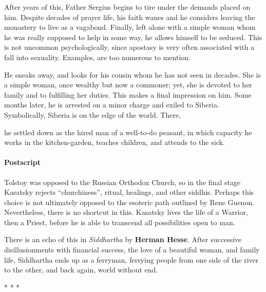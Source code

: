 After years of this, Father Sergius begins to tire under the demands placed on him. Despite decades of prayer life, his faith wanes and he considers leaving the monastery to live as a vagabond. Finally, left alone with a simple woman whom he was really supposed to help in some way, he allows himself to be seduced. This is not uncommon psychologically, since apostasy is very often associated with a fall into sexuality. Examples, are too numerous to mention.

He sneaks away, and looks for his cousin whom he has not seen in decades. She is a simple woman, once wealthy but now a commoner; yet, she is devoted to her family and to fulfilling her duties. This makes a final impression on him. Some months later, he is arrested on a minor charge and exiled to Siberia. Symbolically, Siberia is on the edge of the world. There,

\begin{quotex}
he settled down as the hired man of a well-to-do peasant, in which capacity he works in the kitchen-garden, teaches children, and attends to the sick.
\end{quotex}


\paragraph{Postscript}


Tolstoy was opposed to the Russian Orthodox Church, so in the final stage Kasatsky rejects ``churchiness'', ritual, healings, and other siddhis. Perhaps this choice is not ultimately opposed to the esoteric path outlined by Rene Guenon. Nevertheless, there is no shortcut in this. Kasatsky lives the life of a Warrior, then a Priest, before he is able to transcend all possibilities open to man.

There is an echo of this in \emph{Siddhartha} by \textbf{Herman Hesse}. After successive disillusionments with financial success, the love of a beautiful woman, and family life, Siddhartha ends up as a ferryman, ferrying people from one side of the river to the other, and back again, world without end.



\begin{center}* * *\end{center}

